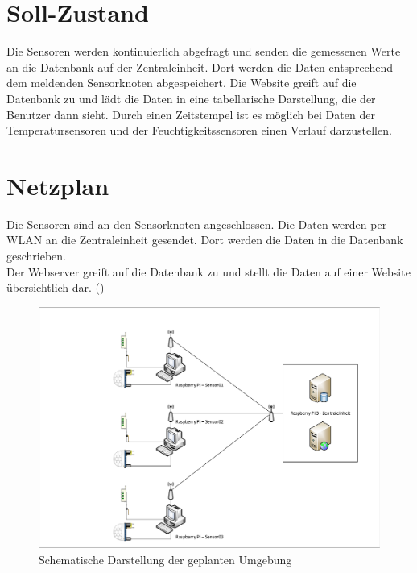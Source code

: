 \section{Soll-Zustand}
Die Sensoren werden kontinuierlich abgefragt und senden die gemessenen Werte an
die Datenbank auf der Zentraleinheit. Dort werden die Daten entsprechend dem
meldenden Sensorknoten abgespeichert. Die Website greift auf die Datenbank zu
und lädt die Daten in eine tabellarische Darstellung, die der Benutzer dann
sieht. Durch einen Zeitstempel ist es möglich bei Daten der Temperatursensoren
und der Feuchtigkeitssensoren einen Verlauf darzustellen.

\section{Netzplan}

Die Sensoren sind an den Sensorknoten angeschlossen. Die Daten werden per WLAN
an die Zentraleinheit gesendet. Dort werden die Daten in die Datenbank
geschrieben.\\
Der Webserver greift auf die Datenbank zu und stellt die Daten auf einer Website
übersichtlich dar. ()

\begin{figure} [htb]
\begin{centering}
\includegraphics[scale=0.4]{Bilder/Netzplan.pdf}
\caption[Schematische Darstellung der geplanten Umgebung]{Schematische
Darstellung der geplanten Umgebung}
\label{Darstellung_Umgebung}
\end{centering}
\end{figure} 

